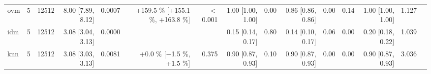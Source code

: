 \begin{table}[htbp]
{\begin{tabular}{lrrrrrrrrrrrrrl}
ovm & 5 & 12512 & 8.00 [7.89, 8.12] & 0.0007 & +159.5 \% [+155.1 \%, +163.8 \%] & $<$0.001 & 1.00 [1.00, 1.00] & 0.00 & 0.86 [0.86, 0.86] & 0.00 & 0.14 & 1.00 [1.00, 1.00] & 1.127 &  \\
idm & 5 & 12512 & 3.08 [3.04, 3.13] & 0.0000 &  &  & 0.15 [0.14, 0.17] & 0.80 & 0.14 [0.10, 0.17] & 0.06 & 0.00 & 0.20 [0.18, 0.22] & 1.039 &  \\
knn & 5 & 12512 & 3.08 [3.03, 3.13] & 0.0081 & +0.0 \% [$-$1.5 \%, +1.5 \%] & 0.375 & 0.90 [0.87, 0.93] & 0.10 & 0.90 [0.87, 0.93] & 0.00 & 0.00 & 0.90 [0.87, 0.93] & 3.036 &  \\
\bottomrule
\end{tabular}
}
\end{table}
